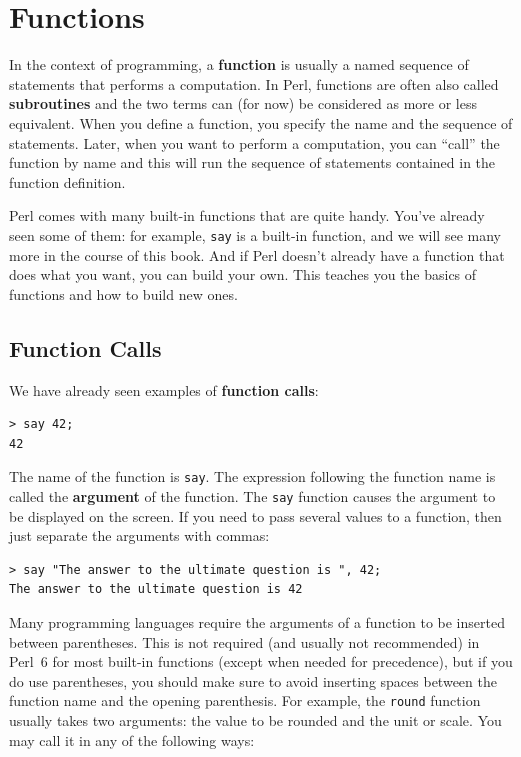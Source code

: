 \chapter{Functions}
\label{funcchap}

In the context of programming, a {\bf function} 
is usually a named sequence of statements 
that performs a computation.  In Perl, functions are often 
also called {\bf subroutines} and the two terms can (for now) 
be considered as more or less equivalent. When you define 
a function, you specify the name and the sequence of statements.  
Later, when you want to perform a computation, you can ``call'' 
the function by name and this will run the sequence of statements 
contained in the function definition.

Perl comes with many built-in functions that are quite handy.  
You've already seen some of them: for example, {\tt say} is a 
built-in function, and we will see many more in the course of 
this book. And if Perl doesn't already have a function that does 
what you want, you can build your own. This teaches you the basics 
of functions and how to build new ones.

\section{Function Calls}
\label{functionchap}

We have already seen examples of {\bf function calls}:

\begin{verbatim}
> say 42;
42
\end{verbatim}
%
The name of the function is {\tt say}.  The expression following 
the function name is called the {\bf argument} of the function. 
The {\tt say} function causes the argument to be displayed 
on the screen. If you need to pass several values to a function, 
then just separate the arguments with commas:
\begin{verbatim}
> say "The answer to the ultimate question is ", 42;
The answer to the ultimate question is 42
\end{verbatim}
%

Many programming languages require the arguments of a function to 
be inserted between parentheses. This is not required (and 
usually not recommended) in Perl~6 for most built-in functions 
(except when needed for precedence), but if you do use 
parentheses, you should make sure to avoid inserting spaces 
between the function name and the opening parenthesis. 
For example, the {\tt round} function usually takes two 
arguments: the value to be rounded and the unit or scale. 
You may call it in any of the following ways:

